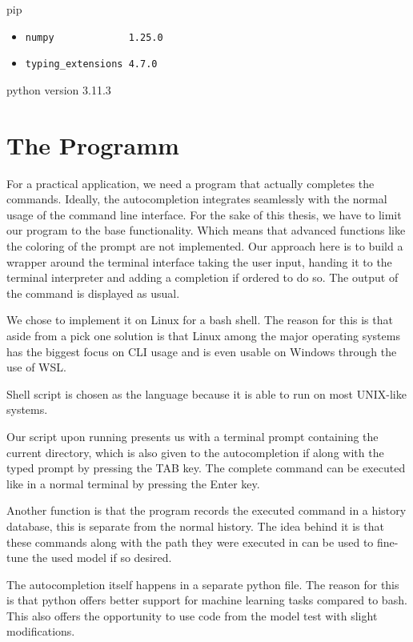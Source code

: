pip
\begin{itemize}
\item \begin{verbatim}
numpy             1.25.0
\end{verbatim}

\item \begin{verbatim}
typing_extensions 4.7.0
\end{verbatim}
  
\end{itemize}


python version  3.11.3



\section{The Programm}
For a practical application, we need a program that actually completes the commands.
Ideally, the autocompletion integrates seamlessly with the normal usage of the command line interface. For the sake of this thesis, we have to limit our program to the base functionality. Which means that advanced functions like the coloring of the prompt are not implemented. Our approach here is to build a wrapper around the terminal interface taking the user input, handing it to the terminal interpreter and adding a completion if ordered to do so. The output of the command is displayed as usual.


We chose to implement it on Linux for a bash shell. The reason for this is that aside from a pick one solution is that Linux among the major operating systems has the biggest focus on CLI usage and is even usable on Windows through the use of WSL.
 

Shell script is chosen as the  language because it is able to run on most UNIX-like systems.


Our script upon running presents us with a terminal prompt containing the current directory, which is also given to the autocompletion if along with the typed prompt by pressing the TAB key. The complete command can be executed like in a normal terminal by pressing the Enter key. 

Another function is that the program records the executed command in a history database, this is separate from the normal history. The idea behind it is that these commands along with the path they were executed in can be used to fine-tune the used model if so desired.


The autocompletion itself happens in a separate python file. The reason for this is that python offers better support for machine learning tasks compared to bash. This also offers the opportunity to use code from the model test with slight modifications.

